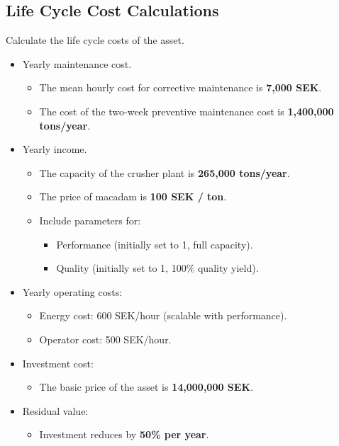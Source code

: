 \documentclass[a4paper,12pt]{exam}
\begin{document}
\subsection{Life Cycle Cost Calculations}
Calculate the life cycle costs of the asset.
\begin{itemize}
    \item Yearly maintenance cost.
    \begin{itemize}
    \item The mean hourly cost for corrective maintenance is \textbf{7,000 SEK}. 
    \item The cost of the two-week preventive maintenance cost is \textbf{1,400,000 tons/year}. 
    \end{itemize}    
    \item Yearly income. 
    \begin{itemize}
    \item The capacity of the crusher plant is \textbf{265,000 tons/year}.
    \item The price of macadam is \textbf{ 100 SEK / ton}.
    \item Include parameters for: \begin{itemize}
        \item Performance (initially set to 1, full capacity).
        \item Quality (initially set to 1, 100\% quality yield).
    \end{itemize}
    \end{itemize}
    \item Yearly operating costs:
    \begin{itemize}
        \item Energy cost: 600 SEK/hour (scalable with performance).
        \item Operator cost: 500 SEK/hour.
    \end{itemize}
    \item Investment cost: 
    \begin{itemize}
    \item The basic price of the asset is \textbf{ 14,000,000 SEK}.
    \end{itemize}
    \item Residual value: 
    \begin{itemize}
    \item Investment reduces by \textbf{50\% per year}.
    \end{itemize}
\end{itemize}
\end{document}
